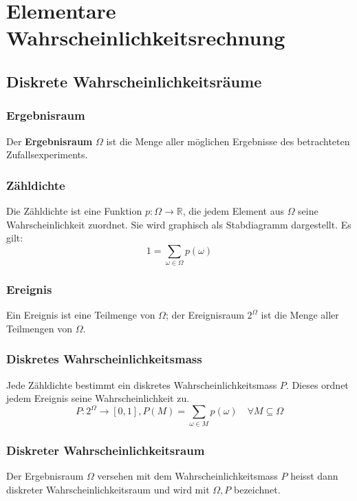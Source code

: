 \section{Elementare Wahrscheinlichkeitsrechnung}
\label{sec:elementare-wahrscheinlichkeitsrechnung}
\subsection{Diskrete Wahrscheinlichkeitsräume}
\label{sec:diskrete-wahrscheinlichkeitsrume}
\subsubsection{Ergebnisraum}
\label{sec:definition}
Der \textbf{Ergebnisraum} $\Omega$ ist die Menge aller möglichen Ergebnisse des betrachteten Zufallsexperiments.
\subsubsection{Zähldichte}
\label{sec:zhl-dichte}
Die Zähldichte ist eine Funktion $p:\Omega \rightarrow \mathbb{R}$, die jedem Element aus $\Omega$ seine Wahrscheinlichkeit zuordnet.
Sie wird graphisch als Stabdiagramm dargestellt. Es gilt:
\begin{equation*}
    1 = \sum_{\omega \in \Omega} p(\omega)
\end{equation*}
\subsubsection{Ereignis}
Ein Ereignis ist eine Teilmenge von $\Omega$; der Ereignisraum $2^{\Omega}$ ist die Menge aller Teilmengen von $\Omega$.
\subsubsection{Diskretes Wahrscheinlichkeitsmass}
\label{sec:diskretes-wahrscheinlichkeitsmass}
Jede Zähldichte bestimmt ein diskretes Wahrscheinlichkeitsmass $P$. Dieses ordnet jedem Ereignis seine Wahrscheinlichkeit zu.
\begin{equation*}
    P: 2^{\Omega} \rightarrow [0,1],P(M) = \sum_{\omega \in M} p(\omega) \quad \forall M \subseteq \Omega
\end{equation*}
\subsubsection{Diskreter Wahrscheinlichkeitsraum}
\label{sec:diskreter-wahrscheinlichkeitsraum}
Der Ergebnisraum $\Omega$ versehen mit dem Wahrscheinlichkeitsmass $P$ heisst dann diskreter Wahrscheinlichkeitsraum und wird mit $\Omega ,P$ bezeichnet.

